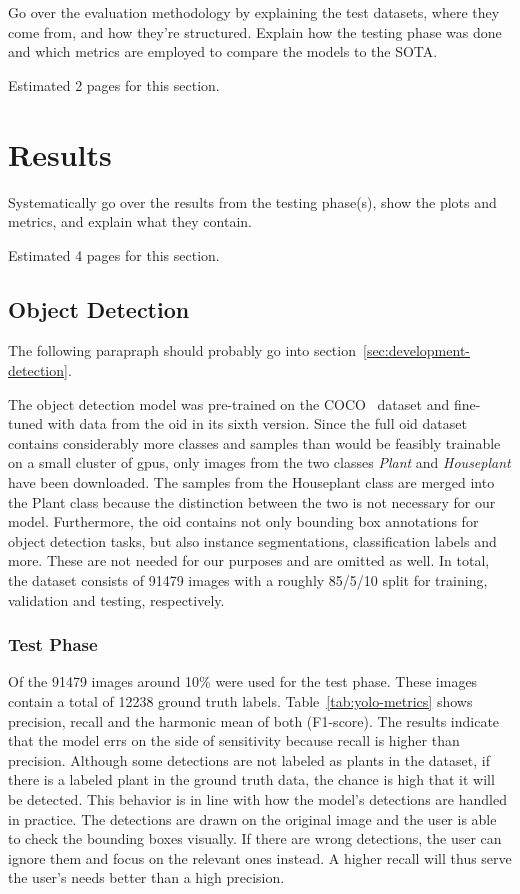 \documentclass[draft,final]{vutinfth} %
\begin{document}
Go over the evaluation methodology by explaining the test datasets,
where they come from, and how they're structured. Explain how the
testing phase was done and which metrics are employed to compare the
models to the SOTA.

Estimated 2 pages for this section.

\section{Results}
\label{sec:results}

Systematically go over the results from the testing phase(s), show the
plots and metrics, and explain what they contain. 

Estimated 4 pages for this section.

\subsection{Object Detection}
\label{ssec:yolo-eval}

The following parapraph should probably go into
section~\ref{sec:development-detection}.

The object detection model was pre-trained on the COCO~\cite{lin2015}
dataset and fine-tuned with data from the \gls{oid}
\cite{kuznetsova2020} in its sixth version. Since the full \gls{oid}
dataset contains considerably more classes and samples than would be
feasibly trainable on a small cluster of \glspl{gpu}, only images from
the two classes \emph{Plant} and \emph{Houseplant} have been
downloaded. The samples from the Houseplant class are merged into the
Plant class because the distinction between the two is not necessary
for our model. Furthermore, the \gls{oid} contains not only bounding
box annotations for object detection tasks, but also instance
segmentations, classification labels and more. These are not needed
for our purposes and are omitted as well. In total, the dataset
consists of 91479 images with a roughly 85/5/10 split for training,
validation and testing, respectively.

\subsubsection{Test Phase}
\label{sssec:yolo-test}

Of the 91479 images around 10\% were used for the test phase. These
images contain a total of 12238 ground truth
labels. Table~\ref{tab:yolo-metrics} shows precision, recall and the
harmonic mean of both (F1-score). The results indicate that the model
errs on the side of sensitivity because recall is higher than
precision. Although some detections are not labeled as plants in the
dataset, if there is a labeled plant in the ground truth data, the
chance is high that it will be detected. This behavior is in line with
how the model's detections are handled in practice. The detections are
drawn on the original image and the user is able to check the bounding
boxes visually. If there are wrong detections, the user can ignore
them and focus on the relevant ones instead. A higher recall will thus
serve the user's needs better than a high precision.
\end{document}
